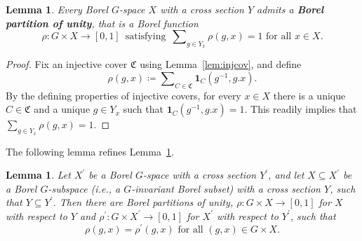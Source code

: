 \documentclass{amsart}
\numberwithin{equation}{subsection}
\newtheorem{lem}[thm]{Lemma}
\theoremstyle{remark}
\begin{document}
\begin{lem}\label{lem:borpart}
Every Borel \(G\)-space \(X\) with a cross section \(Y\) admits a {\bf Borel partition of unity}, that is a Borel function
\[\rho:G\times X\longrightarrow\left[0,1\right]\,\text{ satisfying }\,\sum\nolimits_{g\in Y_{x}}\rho\left(g,x\right)=1\text{ for all }x\in X.\]
\end{lem}

\begin{proof}
Fix an injective cover \(\mathfrak{C}\) using Lemma~\ref{lem:injcov}, and define
\[\rho\left(g,x\right)\coloneqq\sum\nolimits_{C\in\mathfrak{C}}\mathbf{1}_{C}\left(g^{-1},g.x\right).\]
By the defining properties of injective covers, for every \(x\in X\) there is a unique \(C\in\mathfrak{C}\) and a unique \(g\in Y_{x}\) such that \(\mathbf{1}_{C}\left(g^{-1},g.x\right)=1\). This readily implies that \(\sum\nolimits_{g\in Y_{x}}\rho\left(g,x\right)=1\).
\end{proof}

The following lemma refines Lemma~\ref{lem:borpart}.

\begin{lem}\label{lem:borpartmon}
Let \(X^{\prime}\) be a Borel \(G\)-space with a cross section \(Y^{\prime}\), and let \(X\subseteq X^{\prime}\) be a Borel \(G\)-subspace (i.e., a \(G\)-invariant Borel subset) with a cross section \(Y\), such that \(Y\subseteq Y^{\prime}\). Then there are Borel partitions of unity, \(\rho:G\times X\to\left[0,1\right]\) for \(X\) with respect to \(Y\) and \(\rho^{\prime}:G\times X^{\prime}\to\left[0,1\right]\) for \(X^{\prime}\) with respect to \(Y^{\prime}\), such that
\[\rho\left(g,x\right)=\rho^{\prime}\left(g,x\right)\text{ for all }\left(g,x\right)\in G\times X.\]
\end{lem}
\end{document}
